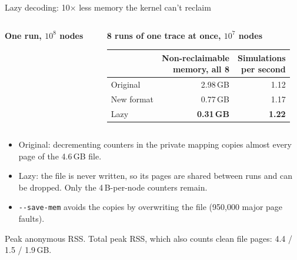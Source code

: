 \documentclass[aspectratio=169,11pt]{beamer}
\newcommand{\source}[1]{{\scriptsize\color{black!55}\par\vspace{2mm}#1\par}}
\begin{document}
\begin{frame}{Lazy decoding: 10$\times$ less memory the kernel can't reclaim}
\begin{columns}[T]
\begin{column}{0.5\textwidth}
\centering\textbf{One run, $10^8$ nodes}\par\vspace{1mm}
\end{column}
\begin{column}{0.46\textwidth}
\centering\textbf{8 runs of one trace at once, $10^7$ nodes}\par\vspace{2mm}
\footnotesize
\begin{tabular}{lrr}
\toprule
& \shortstack[r]{\textbf{Non-reclaimable}\\\textbf{memory, all 8}} & \shortstack[r]{\textbf{Simulations}\\\textbf{per second}} \\
\midrule
Original & 2.98\,GB & 1.12 \\
New format & 0.77\,GB & 1.17 \\
Lazy & \textbf{0.31\,GB} & \textbf{1.22} \\
\bottomrule
\end{tabular}
\end{column}
\end{columns}
\vspace{4mm}
\small
\begin{itemize}\setlength{\itemsep}{1pt}
\item Original: decrementing counters in the private mapping copies almost every page of the 4.6\,GB file.
\item Lazy: the file is never written, so its pages are shared between runs and can be dropped. Only the 4\,B-per-node counters remain.
\item \texttt{-{}-save-mem} avoids the copies by overwriting the file (950,000 major page faults).
\end{itemize}
\source{Peak anonymous RSS. Total peak RSS, which also counts clean file pages: 4.4 / 1.5 / 1.9\,GB. \studysource}
\end{frame}
\end{document}
